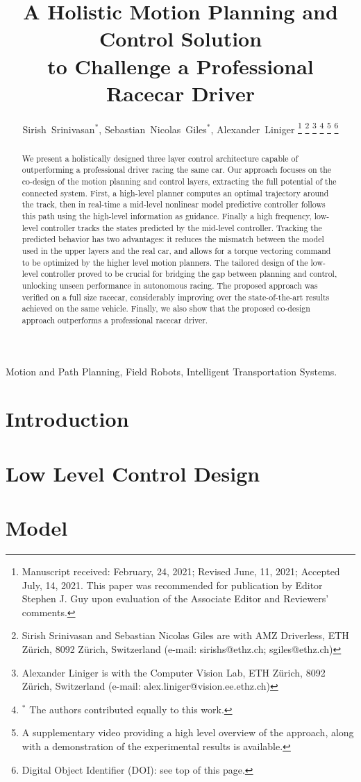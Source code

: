 \documentclass[letterpaper, 10 pt, journal, twoside]{ieeetran}
\title{A Holistic Motion Planning and Control Solution \\to Challenge a Professional Racecar Driver}
\author{Sirish~Srinivasan$^{*}$, Sebastian~Nicolas~Giles$^{*}$, Alexander~Liniger%
\thanks{Manuscript received: February, 24, 2021; Revised June, 11, 2021; Accepted July, 14, 2021. This paper was recommended for publication by Editor Stephen J. Guy upon evaluation of the Associate Editor and Reviewers' comments.}
\thanks{Sirish Srinivasan and Sebastian Nicolas Giles are with AMZ Driverless, ETH Z\"urich, 8092 Z\"urich, Switzerland (e-mail: sirishs@ethz.ch; sgiles@ethz.ch)}%
\thanks{Alexander Liniger is with the Computer Vision Lab, ETH Z\"urich, 8092 Z\"urich, Switzerland (e-mail: alex.liniger@vision.ee.ethz.ch)}
\thanks{$^*$ The authors contributed equally to this work.}
\thanks{A supplementary video providing a high level overview of the approach, along with a demonstration of the experimental results is available.}
\thanks{Digital Object Identifier (DOI): see top of this page.}
}%
\begin{document}
\maketitle
\begin{abstract}
We present a holistically designed three layer control architecture capable of outperforming a professional driver racing the same car. Our approach focuses on the co-design of the motion planning and control layers, extracting the full potential of the connected system. First, a high-level planner computes an optimal trajectory around the track, then in real-time a mid-level nonlinear model predictive controller follows this path using the high-level information as guidance. Finally a high frequency, low-level controller tracks the states predicted by the mid-level controller. Tracking the predicted behavior has two advantages: it reduces the mismatch between the model used in the upper layers and the real car, and allows for a torque vectoring command to be optimized by the higher level motion planners. The tailored design of the low-level controller proved to be crucial for bridging the gap between planning and control, unlocking unseen performance in autonomous racing. The proposed approach was verified on a full size racecar, considerably improving over the state-of-the-art results achieved on the same vehicle. Finally, we also show that the proposed co-design approach outperforms a professional racecar driver.

\end{abstract}

\begin{IEEEkeywords}
Motion and Path Planning, Field Robots, Intelligent Transportation Systems.
\end{IEEEkeywords}

\IEEEpeerreviewmaketitle

\section{Introduction}
\label{sec:intro}


\section{Low Level Control Design}
\label{sec:llc_formulation}


\section{Model}
\label{sec:model}

\end{document}
